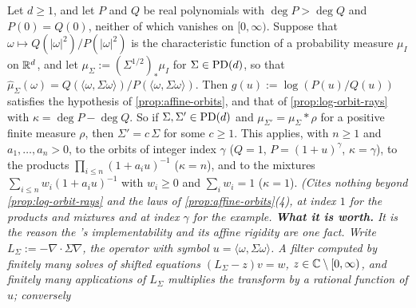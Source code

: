 \begin{proposition}
\label{prop:rational-symbols}
\leanok
Let $d \ge 1$, and let $P$ and $Q$ be real polynomials with $\operatorname{deg}P > \operatorname{deg}Q$ and $P(0) = Q(0)$,
neither of which vanishes on $[0,\infty)$. Suppose that $\omega \mapsto Q(|\omega|^2)/P(|\omega|^2)$
is the characteristic function of a probability measure $\mu_I$ on $\mathbb{R}^d$, and let
$\mu_\Sigma := (\Sigma^{1/2})_*\mu_I$ for $\Sigma \in \mathrm{PD}(d)$, so that
$\widehat\mu_\Sigma(\omega) = Q(\langle\omega,\Sigma\omega\rangle)/P(\langle\omega,\Sigma\omega\rangle)$.
Then $g(u) := \log(P(u)/Q(u))$ satisfies the hypothesis of \ref{prop:affine-orbits}, and that of
\ref{prop:log-orbit-rays} with $\kappa = \operatorname{deg}P - \operatorname{deg}Q$. So if $\Sigma, \Sigma' \in \mathrm{PD}(d)$ and
$\mu_{\Sigma'} = \mu_\Sigma * \rho$ for a positive finite measure $\rho$, then $\Sigma' = c\,\Sigma$ for
some $c \ge 1$. This applies, with $n \ge 1$ and $a_1, \dots, a_n > 0$, to the \Matern{} orbits of integer index
$\gamma$ ($Q = 1$, $P = (1+u)^\gamma$, $\kappa = \gamma$), to the products
$\prod_{i\le n}(1 + a_iu)^{-1}$ ($\kappa = n$), and to the mixtures $\sum_{i\le n}w_i(1 + a_iu)^{-1}$
with $w_i \ge 0$ and $\sum_iw_i = 1$ ($\kappa = 1$).
\statusT\quad\emph{(Cites nothing beyond \ref{prop:log-orbit-rays} and the \Matern{} laws of
\ref{prop:affine-orbits}(4), at index $1$ for the products and mixtures and at index $\gamma$ for the
\Matern{} example. \textbf{What it is worth.} It is the reason the \Matern{}'s
implementability and its affine rigidity are one fact. Write $L_\Sigma := -\nabla\cdot\Sigma\nabla$,
the operator with symbol $u = \langle\omega,\Sigma\omega\rangle$. A filter computed by finitely many
solves of shifted equations $(L_\Sigma - z)v = w$, $z \in \mathbb{C} \setminus [0,\infty)$, and finitely
many applications of $L_\Sigma$ multiplies the transform by a rational function of $u$; conversely
}
\end{proposition}
